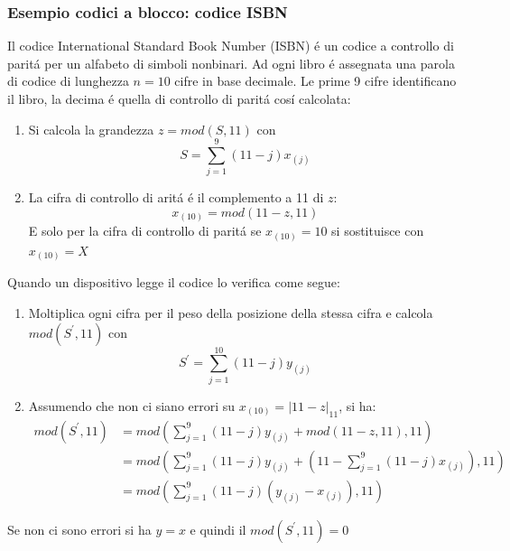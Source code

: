         \subsubsection{Esempio codici a blocco: codice ISBN}
            Il codice International Standard Book Number (ISBN) é un codice a controllo di paritá per un alfabeto di simboli nonbinari. 
            Ad ogni libro é assegnata una parola di codice di lunghezza $n=10$ cifre in base decimale. Le prime 9 cifre identificano il libro, 
            la decima é quella di controllo di paritá cosí calcolata:
            \begin{enumerate}
                \item {
                    Si calcola la grandezza $z = mod(S,11)$ con
                    \[
                        S = \sum_{j=1}^{9} (11-j)x_{(j)}
                    \]
                }
                \item {
                    La cifra di controllo di aritá é il complemento a 11 di $z$:
                    \[
                        x_{(10)} = mod(11-z,11)  
                    \]
                    E solo per la cifra di controllo di paritá se $x_{(10)} = 10$ si sostituisce con 
                    $x_{(10)} = X$
                }
            \end{enumerate}
            Quando un dispositivo legge il codice lo verifica come segue:
            \begin{enumerate}
                \item {
                    Moltiplica ogni cifra per il peso della posizione della stessa cifra e calcola $mod(S^\prime,11)$ con
                    \[
                        S^\prime = \sum_{j=1}^{10} (11-j)y_{(j)}
                    \]
                }
                \item {
                    Assumendo che non ci siano errori su $x_{(10)} = |11-z|_{11}$, si ha:
                    \begin{align}
                        mod(S^\prime,11) &= mod \left( \sum_{j=1}^{9} (11-j)y_{(j)} + mod(11-z,11),11\right) \nonumber \\
                                         &= mod \left( \sum_{j=1}^{9} (11-j)y_{(j)} + \left(11-\sum_{j=1}^{9} (11-j)x_{(j)}\right),11\right)\nonumber \\
                                         &= mod \left(\sum_{j=1}^{9} (11-j)(y_{(j)}-x_{(j)}),11\right)
                    \end{align}
                }
            \end{enumerate}
            Se non ci sono errori si ha $y=x$ e quindi il $mod(S^\prime,11) = 0$

